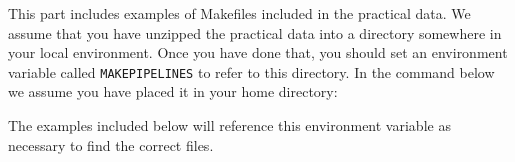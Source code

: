 \label{part:examples}

\begin{vplace}[0.7]
	
	\thispagestyle{empty}
	\large
	\noindent This part includes examples of Makefiles included in the practical	data. We assume that you have unzipped the practical data into a directory somewhere in your local environment. Once you have done that, you should set an environment variable called \texttt{MAKEPIPELINES} to refer to this directory. In the command below we assume you have placed it in your home directory:
	
	The examples included below will reference this environment variable as necessary to find the correct files.
	
\end{vplace}




 \clearpage  \setcounter{codehighlight}{0}
 \clearpage \setcounter{codehighlight}{0}
 \clearpage \setcounter{codehighlight}{0}

